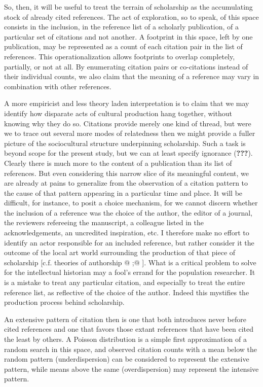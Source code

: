 So, then, it will be useful to treat the terrain of scholarship as the
accumulating stock of already cited references. The act of exploration,
so to speak, of this space consists in the inclusion, in the reference
list of a scholarly publication, of a particular set of citations and
not another. A footprint in this space, left by one publication, may be
represented as a count of each citation pair in the list of references.
This operationalization allows footprints to overlap completely,
partially, or not at all. By enumerating citation pairs or co-citations
instead of their individual counts, we also claim that the meaning of a
reference may vary in combination with other references.

A more empiricist and less theory laden interpretation is to claim that
we may identify how disparate acts of cultural production hang together,
without knowing why they do so. Citations provide merely one kind of
thread, but were we to trace out several more modes of relatedness then
we might provide a fuller picture of the sociocultural structure
underpinning scholarship. Such a task is beyond scope for the present
study, but we can at least specify ignorance ({\textbf{???}}). Clearly
there is much more to the content of a publication than its list of
references. But even considering this narrow slice of its meaningful
content, we are already at pains to generalize from the observation of a
citation pattern to the cause of that pattern appearing in a particular
time and place. It will be difficult, for instance, to posit a choice
mechanism, for we cannot discern whether the inclusion of a reference
was the choice of the author, the editor of a journal, the reviewers
refereeing the manuscript, a colleague listed in the acknowledgements,
an uncredited inspiration, etc. I therefore make no effort to identify
an actor responsible for an included reference, but rather consider it
the outcome of the local art world surrounding the production of that
piece of scholarship {[}c.f. theories of authorship @ ;@ {]}. What is a
critical problem to solve for the intellectual historian may a fool's
errand for the population researcher. It is a mistake to treat any
particular citation, and especially to treat the entire reference list,
as reflective of the choice of the author. Indeed this mystifies the
production process behind scholarship.

An extensive pattern of citation then is one that both introduces never
before cited references and one that favors those extant references that
have been cited the least by others. A Poisson distribution is a simple
first approximation of a random search in this space, and observed
citation counts with a mean below the random pattern (underdispersion)
can be considered to represent the extensive pattern, while means above
the same (overdispersion) may represent the intensive pattern.

